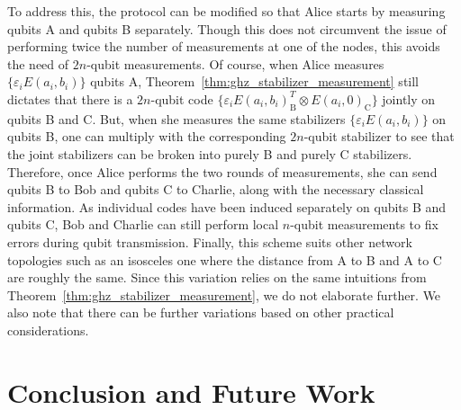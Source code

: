 \documentclass[journal,onecolumn]{IEEEtran}
\begin{document}
To address this, the protocol can be modified so that Alice starts by measuring qubits A and qubits B separately.
Though this does not circumvent the issue of performing twice the number of measurements at one of the nodes, this avoids the need of $2n$-qubit measurements.
Of course, when Alice measures $\{ \varepsilon_i E(a_i,b_i) \}$ qubits A, Theorem~\ref{thm:ghz_stabilizer_measurement} still dictates that there is a $2n$-qubit code $\{ \varepsilon_i E(a_i,b_i)_{\text{B}}^T \otimes E(a_i,0)_{\text{C}} \}$ jointly on qubits B and C.
But, when she measures the same stabilizers $\{ \varepsilon_i E(a_i,b_i) \}$ on qubits B, one can multiply with the corresponding $2n$-qubit stabilizer to see that the joint stabilizers can be broken into purely B and purely C stabilizers.
Therefore, once Alice performs the two rounds of measurements, she can send qubits B to Bob and qubits C to Charlie, along with the necessary classical information.
As individual codes have been induced separately on qubits B and qubits C, Bob and Charlie can still perform local $n$-qubit measurements to fix errors during qubit transmission.
Finally, this scheme suits other network topologies such as an isosceles one where the distance from A to B and A to C are roughly the same.
Since this variation relies on the same intuitions from Theorem~\ref{thm:ghz_stabilizer_measurement}, we do not elaborate further.
We also note that there can be further variations based on other practical considerations.











\section{Conclusion and Future Work}
\label{sec:conclusion}
\end{document}
